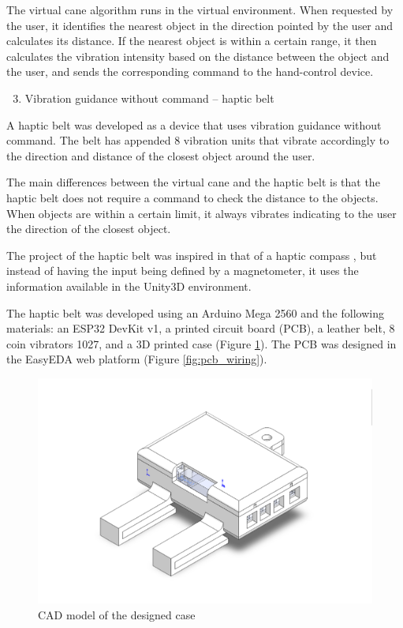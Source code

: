         The virtual cane algorithm runs in the virtual environment. When requested by the user, it identifies the nearest object in the direction pointed by the user and calculates its distance. If the nearest object is within a certain range, it then calculates the vibration intensity based on the distance between the object and the user, and sends the corresponding command to the hand-control device.

        \begin{enumerate} [label = \Alph*)]
            \setcounter{enumi}{2}
            \item Vibration guidance without command – haptic belt
        \end{enumerate}

        A haptic belt was developed as a device that uses vibration guidance without command. The belt has appended 8 vibration units that vibrate accordingly to the direction and distance of the closest object around the user. 

        The main differences between the virtual cane and the haptic belt is that the haptic belt does not require a command to check the distance to the objects. When objects are within a certain limit, it always vibrates indicating to the user the direction of the closest object. 

        The project of the haptic belt was inspired in that of a haptic compass \cite{kylecorry31_instructables_2020}, but instead of having the input being defined by a magnetometer, it uses the information available in the Unity3D environment.

        The haptic belt was developed using an Arduino Mega 2560 and the following materials: an ESP32 DevKit v1, a printed circuit board (PCB), a leather belt, 8 coin vibrators 1027, and a 3D printed case (Figure \ref{fig:case_cinto}). The PCB was designed in the EasyEDA web platform (Figure \ref{fig:pcb_wiring}). 

        \begin{figure}[!htb]
            \centering
            \includegraphics[width = 0.8\linewidth]{Metodologia/Case Cinto.png}
            \caption{CAD model of the designed case}
            \label{fig:case_cinto}
        \end{figure}

